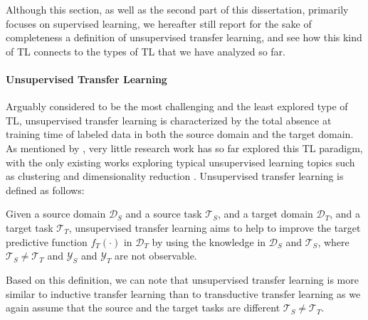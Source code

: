 Although this section, as well as the second part of this dissertation, primarily focuses on supervised learning, we hereafter still report for the sake of completeness a definition of unsupervised transfer learning, and see how this kind of TL connects to the types of TL that we have analyzed so far.

\paragraph{\textbf{\uppercase{U}nsupervised \uppercase{T}ransfer \uppercase{L}earning}}
Arguably considered to be the most challenging and the least explored type of TL, unsupervised transfer learning is characterized by the total absence at training time of labeled data in both the source domain and the target domain. As mentioned by \citet{pan2009survey}, very little research work has so far explored this TL paradigm, with the only existing works exploring typical unsupervised learning topics such as clustering \cite{dai2008self, jin2011transferring, qian2015cluster} and dimensionality reduction \cite{wang2008transferred, zhu2013self, zhu2016robust}. Unsupervised transfer learning is defined as follows:
\begin{definition}
	Given a source domain $\mathcal{D}_S$ and a source task $\mathcal{T}_S$, and a target domain $\mathcal{D}_T$, and a target task $\mathcal{T}_T$, unsupervised transfer learning aims to help to improve the target predictive function $f_T(\cdot)$ in $\mathcal{D}_T$ by using the knowledge in $\mathcal{D}_S$ and $\mathcal{T}_S$, where $\mathcal{T}_S \neq \mathcal{T}_T$ and $\mathcal{Y}_S$ and $\mathcal{Y}_T$ are not observable. 
\end{definition}
Based on this definition, we can note that unsupervised transfer learning is more similar to inductive transfer learning than to transductive transfer learning as we again assume that the source and the target tasks are different $\mathcal{T}_S \neq \mathcal{T}_T$.


